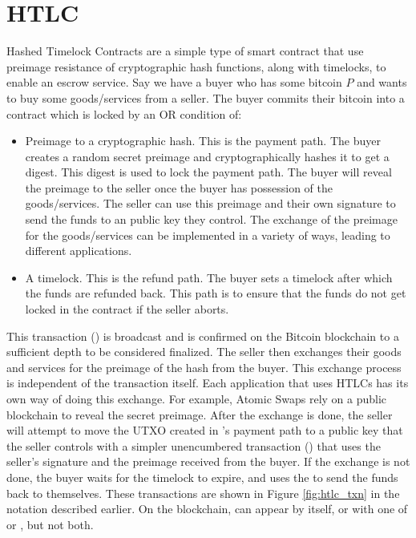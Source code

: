 \section{HTLC}
Hashed Timelock Contracts are a simple type of smart contract that use preimage resistance of cryptographic hash functions, along with timelocks, to enable an escrow service. Say we have a buyer who has some bitcoin $P$ and wants to buy some goods/services from a seller. The buyer commits their bitcoin into a contract which is locked by an OR condition of:
\begin{itemize}
    \item Preimage to a cryptographic hash. This is the payment path. The buyer creates a random secret preimage and cryptographically hashes it to get a digest. This digest is used to lock the payment path. The buyer will reveal the preimage to the seller once the buyer has possession of the goods/services. The seller can use this preimage and their own signature to send the funds to an public key they control. The exchange of the preimage for the goods/services can be implemented in a variety of ways, leading to different applications.
    \item A timelock. This is the refund path. The buyer sets a timelock after which the funds are refunded back. This path is to ensure that the funds do not get locked in the contract if the seller aborts. 
\end{itemize}

This transaction (\htlctxn{}) is broadcast and is confirmed on the Bitcoin blockchain to a sufficient depth to be considered finalized. The seller then exchanges their goods and services for the preimage of the hash from the buyer. This exchange process is independent of the transaction itself. Each application that uses HTLCs has its own way of doing this exchange. For example, Atomic Swaps rely on a public blockchain to reveal the secret preimage. After the exchange is done, the seller will attempt to move the UTXO created in \htlctxn{}'s payment path to a public key that the seller controls with a simpler unencumbered transaction (\sellertxn{}) that uses the seller's signature and the preimage received from the buyer. If the exchange is not done, the buyer waits for the timelock to expire, and uses the  to send the funds back to themselves. These transactions are shown in Figure \ref{fig:htlc_txn} in the notation described earlier. On the blockchain, \htlctxn{} can appear by itself, or with one of \sellertxn{} or , but not both.

